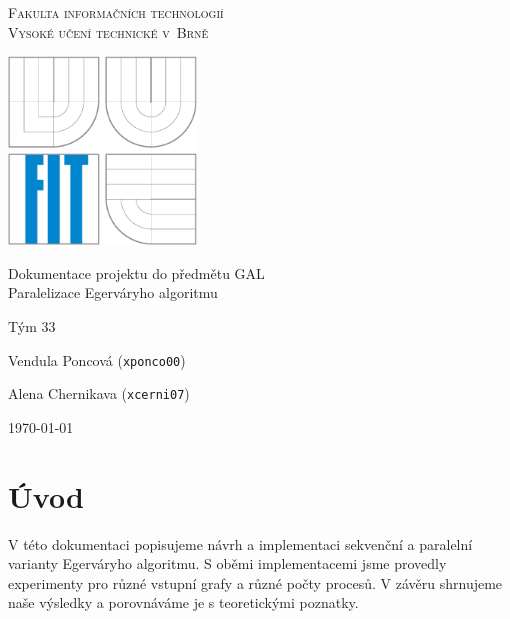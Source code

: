 \documentclass[a4paper, 12pt, titlepage, final]{article}[3. prosinec 2011]
\begin{document}

\begin{titlepage}
\begin{center}

\textsc{
\Large Fakulta informačních technologií 
\medskip\\
Vysoké učení technické v~Brně}


{\parbox{5cm}{\centering\includegraphics[height=5cm]{img/logo.eps}}}


{\large Dokumentace projektu do předmětu GAL} \medskip \\
{\LARGE Paralelizace Egerváryho algoritmu} 



\end{center}

{\large
Tým 33

Vendula Poncová (\texttt{xponco00})

Alena Chernikava (\texttt{xcerni07})
} \hfill {\large\today}

\end{titlepage}


\setcounter{page}{1}

\section{Úvod}

V této dokumentaci popisujeme návrh a implementaci sekvenční a paralelní varianty Egerváryho algoritmu. S oběmi implementacemi jsme provedly experimenty pro různé vstupní grafy a různé počty procesů. V závěru shrnujeme naše výsledky a porovnáváme je s teoretickými poznatky.
\end{document}
